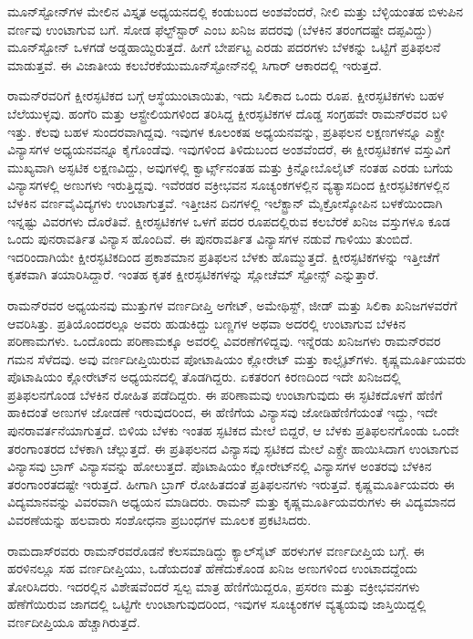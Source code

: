 ಮೂನ್‍ಸ್ಟೋನ್‍ಗಳ ಮೇಲಿನ ವಿಸ್ತೃತ ಅಧ್ಯಯನದಲ್ಲಿ ಕಂಡುಬಂದ ಅಂಶವೆಂದರೆ, ನೀಲಿ ಮತ್ತು ಬೆಳ್ಳಿಯಂತಹ ಬಿಳುಪಿನ ವರ್ಣವು ಉಂಟಾಗುವ ಬಗೆ. ಸೋಡ ಫೆಲ್ಟ್‌ಸ್ಟಾರ್ ಎಂಬ ಖನಿಜ ಪದರವು (ಬೆಳಕಿನ ತರಂಗದಷ್ಟೇ ದಪ್ಪವಿದ್ದು) ಮೂನ್‍ಸ್ಟೋನ್ ಒಳಗಡೆ ಅಡ್ಡಹಾಯ್ದಿರುತ್ತದೆ. ಹೀಗೆ ಬೇರ್ಪಟ್ಟ ಎರಡು ಪದರಗಳು ಬೆಳಕನ್ನು ಒಟ್ಟಿಗೆ ಪ್ರತಿಫಲನೆ ಮಾಡುತ್ತವೆ. ಈ ವಿಜಾತೀಯ ಕಲಬೆರಕೆಯು\break ಮೂನ್‍ಸ್ಟೋನ್‍ನಲ್ಲಿ ಸಿಗಾರ್ ಆಕಾರದಲ್ಲಿ ಇರುತ್ತದೆ.

ರಾಮನ್‍ರವರಿಗೆ ಕ್ಷೀರಸ್ಫಟಿಕದ ಬಗ್ಗೆ ಆಸ್ಥೆಯುಂಟಾಯಿತು, ಇದು ಸಿಲಿಕಾದ ಒಂದು ರೂಪ. ಕ್ಷೀರಸ್ಫಟಿಕಗಳು ಬಹಳ ಬೆಲೆಯುಳ್ಳವು. ಹಂಗೆರಿ ಮತ್ತು ಆಸ್ಟ್ರೇಲಿಯಗಳಿಂದ ತರಿಸಿದ್ದ ಕ್ಷೀರಸ್ಫಟಿಕಗಳ ದೊಡ್ಡ ಸಂಗ್ರಹವೇ ರಾಮನ್‍ರವರ ಬಳಿ ಇತ್ತು. ಕೆಲವು ಬಹಳ ಸುಂದರವಾಗಿದ್ದವು. ಇವುಗಳ ಕೂಲಂಕಷ ಅಧ್ಯಯನವನ್ನು, ಪ್ರತಿಫಲನ ಲಕ್ಷಣಗಳನ್ನೂ ಎಕ್ಸ್\enginline{-}ರೇ ವಿನ್ಯಾಸಗಳ ಅಧ್ಯಯನವನ್ನೂ ಕೈಗೊಂಡೆವು. ಇವುಗಳಿಂದ ತಿಳಿದುಬಂದ ಅಂಶವೆಂದರೆ, ಈ ಕ್ಷೀರಸ್ಫಟಿಕಗಳ ವಸ್ತುವಿಗೆ ಮುಖ್ಯವಾಗಿ ಅಸ್ಫಟಿಕ ಲಕ್ಷಣವಿದ್ದು, ಅವುಗಳಲ್ಲಿ ಕ್ವಾರ್ಟ್ಸ್‌ನಂತಹ ಮತ್ತು ಕ್ರಿನ್ನೋಬೊಲೈಟ್ ನಂತಹ ಎರಡು ಬಗೆಯ ವಿನ್ಯಾಸಗಳಲ್ಲಿ ಅಣುಗಳು ಇರುತ್ತಿದ್ದವು. ಇವೆರಡರ ವಕ್ರೀಭವನ ಸೂಚ್ಯಂಕಗಳಲ್ಲಿನ ವ್ಯತ್ಯಾಸದಿಂದ ಕ್ಷೀರಸ್ಫಟಿಕಗಳಲ್ಲಿನ ಬೆಳಕಿನ ವರ್ಣವೈವಿದ್ಯಗಳು ಉಂಟಾಗುತ್ತವೆ. ಇತ್ತೀಚಿನ ದಿನಗಳಲ್ಲಿ ಇಲೆಕ್ಟ್ರಾನ್ ಮೈಕ್ರೋಸ್ಕೋಪಿನ ಬಳಕೆಯಿಂದಾಗಿ ಇನ್ನಷ್ಟು ವಿವರಗಳು ದೊರೆತಿವೆ. ಕ್ಷೀರಸ್ಫಟಿಕಗಳ ಒಳಗೆ ಪದರ ರೂಪದಲ್ಲಿರುವ ಕಲಬೆರಕೆ ಖನಿಜ ವಸ್ತುಗಳೂ ಕೂಡ ಒಂದು ಪುನರಾವರ್ತಿತ ವಿನ್ಯಾಸ ಹೊಂದಿವೆ. ಈ ಪುನರಾವರ್ತಿತ ವಿನ್ಯಾಸಗಳ ನಡುವೆ ಗಾಳಿಯು ತುಂಬಿದೆ. ಇದರಿಂದಾಗಿಯೇ ಕ್ಷೀರಸ್ಫಟಿಕದಿಂದ ಪ್ರಕಾಶಮಾನ ಪ್ರತಿಫಲನ ಬೆಳಕು ಹೊಮ್ಮುತ್ತದೆ. ಕ್ಷೀರಸ್ಫಟಿಕಗಳನ್ನು ಇತ್ತೀಚೆಗೆ ಕೃತಕವಾಗಿ ತಯಾರಿಸಿದ್ದಾರೆ. ಇಂತಹ ಕೃತಕ ಕ್ಷೀರಸ್ಫಟಿಕಗಳನ್ನು ಸ್ಲೋಚೆಮ್ ಸ್ಟೋನ್ಸ್  ಎನ್ನುತ್ತಾರೆ.

ರಾಮನ್‍ರವರ ಅಧ್ಯಯನವು ಮುತ್ತುಗಳ ವರ್ಣದೀಪ್ತಿ ಅಗೇಟ್, ಅಮೇಥಿಸ್ಟ್, ಜೀಡ್ ಮತ್ತು ಸಿಲಿಕಾ ಖನಿಜಗಳವರೆಗೆ ಆವರಿಸಿತ್ತು. ಪ್ರತಿಯೊಂದರಲ್ಲೂ ಅವರು ಹುಡುಕಿದ್ದು ಬಣ್ಣಗಳ ಅಥವಾ ಅದರಲ್ಲಿ ಉಂಟಾಗುವ ಬೆಳಕಿನ ಪರಿಣಾಮಗಳು. ಒಂದೊಂದು ಪರಿಣಾಮಕ್ಕೂ ಅವರಲ್ಲಿ ವಿವರಣೆಗಳಿದ್ದವು. ಇನ್ನೆರಡು ಖನಿಜಗಳು ರಾಮನ್‍ರವರ ಗಮನ ಸೆಳೆದವು. ಅವು ವರ್ಣದೀಪ್ತಿಯಿರುವ ಪೋಟಾಷಿಯಂ ಕ್ಲೋರೇಟ್ ಮತ್ತು ಕಾಲ್ಸೈಟ್‍ಗಳು. ಕೃಷ್ಣಮೂರ್ತಿಯವರು ಪೊಟಾಷಿಯಂ ಕ್ಲೋರೇಟ್‍ನ ಅಧ್ಯಯನದಲ್ಲಿ ತೊಡಗಿದ್ದರು. ಏಕತರಂಗ ಕಿರಣದಿಂದ ಇದೇ ಖನಿಜದಲ್ಲಿ ಪ್ರತಿಫಲನಗೊಂಡ ಬೆಳಕಿನ ರೋಹಿತ ಪಡೆದಿದ್ದರು. ಈ ಪರಿಣಾಮವು ಉಂಟಾಗುವುದು ಈ ಸ್ಫಟಿಕದೊಳಗೆ ಹೆಣಿಗೆ ಹಾಕಿದಂತೆ ಅಣುಗಳ ಜೋಡಣೆ ಇರುವುದರಿಂದ, ಈ ಹೆಣಿಗೆಯ ವಿನ್ಯಾಸವು ಜೋಡಿಹೆಣಿಗೆಯಂತೆ ಇದ್ದು, ಇದೇ ಪುನರಾವರ್ತನೆಯಾಗುತ್ತದೆ. ಬಿಳಿಯ ಬೆಳಕು ಇಂತಹ ಸ್ಫಟಿಕದ ಮೇಲೆ ಬಿದ್ದರೆ, ಆ ಬೆಳಕು ಪ್ರತಿಫಲನಗೊಂಡು ಒಂದೇ ತರಂಗಾಂತರದ ಬೆಳಕಾಗಿ ಚೆಲ್ಲುತ್ತದೆ. ಈ ಪ್ರತಿಫಲನದ ವಿನ್ಯಾಸವು ಸ್ಫಟಿಕದ ಮೇಲೆ ಎಕ್ಸ್\enginline{-}ರೇ ಹಾಯಿಸಿದಾಗ ಉಂಟಾಗುವ ವಿನ್ಯಾಸವು ಬ್ರಾಗ್ ವಿನ್ಯಾಸವನ್ನು ಹೋಲುತ್ತದೆ. ಪೊಟಾಷಿಯಂ ಕ್ಲೋರೇಟ್‍ನಲ್ಲಿ ವಿನ್ಯಾಸಗಳ ಅಂತರವು ಬೆಳಕಿನ ತರಂಗಾಂರತದಷ್ಟೇ ಇರುತ್ತದೆ. ಹೀಗಾಗಿ ಬ್ರಾಗ್ ರೋಹಿತದಂತೆ ಪ್ರತಿಫಲನಗಳು ಇರುತ್ತವೆ. ಕೃಷ್ಣಮೂರ್ತಿಯವರು ಈ ವಿದ್ಯಮಾನವನ್ನು ವಿವರವಾಗಿ ಅಧ್ಯಯನ ಮಾಡಿದರು. ರಾಮನ್ ಮತ್ತು ಕೃಷ್ಣಮೂರ್ತಿಯವರುಗಳು ಈ ವಿದ್ಯಮಾನದ ವಿವರಣೆಯನ್ನು ಹಲವಾರು ಸಂಶೋಧನಾ ಪ್ರಬಂಧಗಳ ಮೂಲಕ ಪ್ರಕಟಿಸಿದರು.

ರಾಮದಾಸ್‍ರವರು ರಾಮನ್‍ರವರೊಡನೆ ಕೆಲಸಮಾಡಿದ್ದು ಕ್ಯಾಲ್‍ಸೈಟ್ ಹರಳುಗಳ ವರ್ಣದೀಪ್ತಿಯ ಬಗ್ಗೆ. ಈ ಹರಳಿನಲ್ಲೂ ಸಹ ವರ್ಣದೀಪ್ತಿಯು, ಒಡೆಯದಂತೆ ಹೆಣೆದುಕೊಂಡ ಖನಿಜ ಅಣುಗಳಿಂದ ಉಂಟಾದದ್ದೆಂದು ತೋರಿಸಿದರು. ಇದರಲ್ಲಿನ ವಿಶೇಷವೆಂದರೆ ಸ್ವಲ್ಪ ಮಾತ್ರ ಹೆಣಿಗೆಯಿದ್ದರೂ, ಪ್ರಸರಣ ಮತ್ತು ವಕ್ರೀಭವನಗಳು ಹೆಣೆಗೆಯಿರುವ ಜಾಗದಲ್ಲಿ ಒಟ್ಟಿಗೇ ಉಂಟಾಗುವುದರಿಂದ, ಇವುಗಳ ಸೂಚ್ಯಂಕಗಳ ವ್ಯತ್ಯಯವು ಜಾಸ್ತಿಯಿದ್ದಲ್ಲಿ ವರ್ಣದೀಪ್ತಿಯೂ ಹೆಚ್ಚಾಗಿರುತ್ತದೆ.

